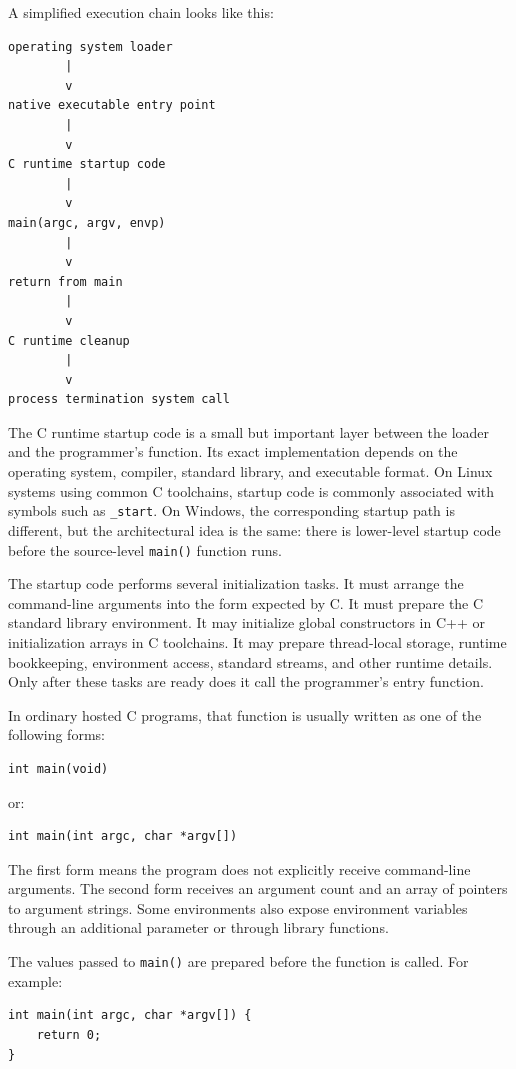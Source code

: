 A simplified execution chain looks like this:

\begin{verbatim}
operating system loader
        |
        v
native executable entry point
        |
        v
C runtime startup code
        |
        v
main(argc, argv, envp)
        |
        v
return from main
        |
        v
C runtime cleanup
        |
        v
process termination system call
\end{verbatim}

The C runtime startup code is a small but important layer between the loader and the programmer's function. Its exact implementation depends on the operating system, compiler, standard library, and executable format. On Linux systems using common C toolchains, startup code is commonly associated with symbols such as \texttt{\_start}. On Windows, the corresponding startup path is different, but the architectural idea is the same: there is lower-level startup code before the source-level \texttt{main()} function runs.

The startup code performs several initialization tasks. It must arrange the command-line arguments into the form expected by C. It must prepare the C standard library environment. It may initialize global constructors in C++ or initialization arrays in C toolchains. It may prepare thread-local storage, runtime bookkeeping, environment access, standard streams, and other runtime details. Only after these tasks are ready does it call the programmer's entry function.

In ordinary hosted C programs, that function is usually written as one of the following forms:

\begin{verbatim}
int main(void)
\end{verbatim}

or:

\begin{verbatim}
int main(int argc, char *argv[])
\end{verbatim}

The first form means the program does not explicitly receive command-line arguments. The second form receives an argument count and an array of pointers to argument strings. Some environments also expose environment variables through an additional parameter or through library functions.

The values passed to \texttt{main()} are prepared before the function is called. For example:

\begin{verbatim}
int main(int argc, char *argv[]) {
    return 0;
}
\end{verbatim}

